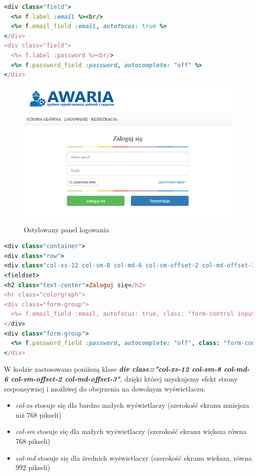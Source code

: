 \documentclass[openright]{xmgr}
\begin{document}
	\newpage
	\begin{lstlisting}[language=Ruby,lineskip={-1pt},caption=Kod odpowiedzialny za panel logowania]
<div class="field">
  <%= f.label :email %><br/>
  <%= f.email_field :email, autofocus: true %>
</div>
<div class="field">
  <%= f.label :password %><br/>
  <%= f.password_field :password, autocomplete: "off" %>
</div>
	\end{lstlisting}
	
	\begin{figure}[!tbh]
		\centering
		\includegraphics[width=\linewidth]{image/panelhtml}
		\caption{Ostylowany panel logowania}
	\end{figure}
\newpage
	\begin{lstlisting}[language=Ruby,lineskip={-1pt},caption= Kod obudowany kodem HTML]
<div class="container">
<div class="row">
<div class="col-xs-12 col-sm-8 col-md-6 col-sm-offset-2 col-md-offset-3">
<fieldset>
<h2 class="text-center">Zaloguj się</h2>
<hr class="colorgraph">
<div class="form-group">
  <%= f.email_field :email, autofocus: true, class: "form-control input-lg", placeholder: "Adres email" %>
</div>
<div class="form-group">
  <%= f.password_field :password, autocomplete: "off", class: "form-control input-lg", placeholder: "Haslo"  %>
</div>
	\end{lstlisting}

W kodzie zastosowano poniższą klase \textbf{\textit{div class="col-xs-12 col-sm-8 col-md-6 col-sm-offset-2 col-md-offset-3"}}, dzięki której uzyskujemy efekt strony responsywnej \cite{css} i możliwej do obejrzenia na dowolnym wyświetlaczu:
\begin{itemize}
	\item
\textit{col-xs} stosuje się dla bardzo małych wyświetlaczy (szerokość ekranu mniejsza niż 768 pikseli)
\item
\textit{col-sm} stosuje się dla małych wyświetlaczy (szerokość ekranu większa równa 768 pikseli)
\item
\textit{col-md} stosuje się dla średnich wyświetlaczy (szerokość ekranu wieksza, równa 992 pikseli)\\
\end{itemize}
\end{document}
